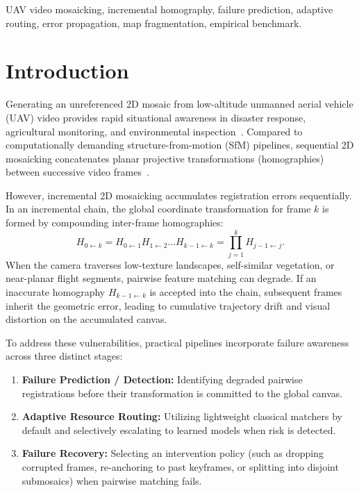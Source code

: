 \documentclass[conference]{IEEEtran}
\begin{document}
\begin{IEEEkeywords}
UAV video mosaicking, incremental homography, failure prediction, adaptive routing, error propagation, map fragmentation, empirical benchmark.
\end{IEEEkeywords}

\section{Introduction}
\label{sec:intro}

Generating an unreferenced 2D mosaic from low-altitude unmanned aerial vehicle (UAV) video provides rapid situational awareness in disaster response, agricultural monitoring, and environmental inspection~\cite{hwang2026,li2023}. Compared to computationally demanding structure-from-motion (SfM) pipelines, sequential 2D mosaicking concatenates planar projective transformations (homographies) between successive video frames~\cite{map2dfusion}.

However, incremental 2D mosaicking accumulates registration errors sequentially. In an incremental chain, the global coordinate transformation for frame $k$ is formed by compounding inter-frame homographies:
\begin{equation}
H_{0 \leftarrow k} = H_{0 \leftarrow 1} H_{1 \leftarrow 2} \dots H_{k-1 \leftarrow k} = \prod_{j=1}^k H_{j-1 \leftarrow j}.
\label{eq:chain_accum}
\end{equation}
When the camera traverses low-texture landscapes, self-similar vegetation, or near-planar flight segments, pairwise feature matching can degrade. If an inaccurate homography $H_{k-1 \leftarrow k}$ is accepted into the chain, subsequent frames inherit the geometric error, leading to cumulative trajectory drift and visual distortion on the accumulated canvas.

To address these vulnerabilities, practical pipelines incorporate failure awareness across three distinct stages:
\begin{enumerate}
    \item \textbf{Failure Prediction / Detection:} Identifying degraded pairwise registrations before their transformation is committed to the global canvas.
    \item \textbf{Adaptive Resource Routing:} Utilizing lightweight classical matchers by default and selectively escalating to learned models when risk is detected.
    \item \textbf{Failure Recovery:} Selecting an intervention policy (such as dropping corrupted frames, re-anchoring to past keyframes, or splitting into disjoint submosaics) when pairwise matching fails.
\end{enumerate}
\end{document}
